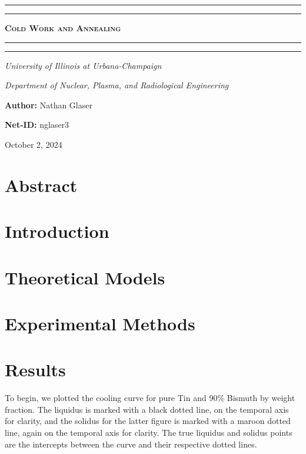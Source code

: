 \documentclass{article}
\begin{document}
\newcommand{\Fig}[3]{\begin{figure}[!h!]\centering\texttt{[image: \#1]}\caption{#2}\label{#3}\end{figure}}
\begin{titlepage}

\centering
\scshape
\vspace{\baselineskip}

%
\rule{\textwidth}{1.6pt}\vspace*{-\baselineskip}\vspace*{2pt}
\rule{\textwidth}{0.4pt}

{\Huge \textbf{\textsc{ Cold Work and Annealing \\
\vspace{15pt}}}}

\rule{\textwidth}{0.4pt}\vspace*{-\baselineskip}\vspace{3.2pt}
\rule{\textwidth}{1.6pt}\vspace{6pt}
\centerline{\textit{University of Illinois at Urbana-Champaign}} 
\centerline{\textit{Department of Nuclear, Plasma, and Radiological Engineering}}
\vspace{1.5\baselineskip}


\large \centerline{\textbf{Author:} Nathan Glaser}
\large \centerline{\textbf{Net-ID:} nglaser3}
\quad

\vfill
\large \centerline{October 2, 2024}
%
\end{titlepage}

\tableofcontents
\newpage
{}
 
\section{Abstract}

\section{Introduction}

\section{Theoretical Models}

\section{Experimental Methods}

\section{Results}
To begin, we plotted the cooling curve for pure Tin and 90\% Bismuth by weight fraction. The liquidus is marked with a black dotted line, on the temporal axis for clarity, and the solidus for the latter figure is marked with a maroon dotted line, again on the temporal axis for clarity. The true liquidus and solidus points are the intercepts between the curve and their respective dotted lines. 
\end{document}
